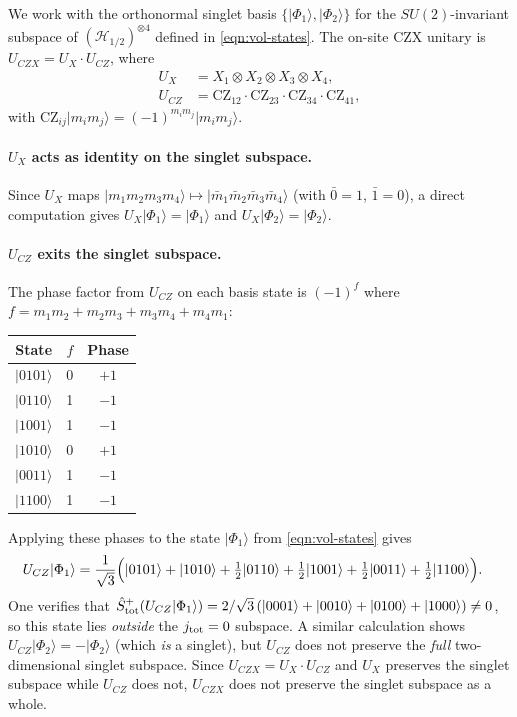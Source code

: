 \documentclass[preprint]{SciPost}
\newcommand{\mc}[1]{\mathcal{#1}}
\newcommand{\ket}[1]{\vert #1 \rangle}
\theoremstyle{plain} %
\begin{document}
We work with the orthonormal singlet basis $\{\ket{\Phi_1},\ket{\Phi_2}\}$ for the $SU(2)$-invariant subspace of $(\mc{H}_{1/2})^{\otimes 4}$ defined in \eqref{eqn:vol-states}. The on-site CZX unitary is $U_{CZX} = U_X \cdot U_{CZ}$, where
\begin{align}
  U_X &= X_1\otimes X_2\otimes X_3\otimes X_4, \\
  U_{CZ} &= \mathrm{CZ}_{12}\cdot\mathrm{CZ}_{23}\cdot\mathrm{CZ}_{34}\cdot\mathrm{CZ}_{41},
\end{align}
with $\mathrm{CZ}_{ij}\ket{m_i m_j} = (-1)^{m_i m_j}\ket{m_i m_j}$.

\paragraph{$U_X$ acts as identity on the singlet subspace.}
Since $U_X$ maps $\ket{m_1 m_2 m_3 m_4}\mapsto\ket{\bar{m}_1\bar{m}_2\bar{m}_3\bar{m}_4}$ (with $\bar{0}=1$, $\bar{1}=0$), a direct computation gives $U_X\ket{\Phi_1} = \ket{\Phi_1}$ and $U_X\ket{\Phi_2} = \ket{\Phi_2}$.

\paragraph{$U_{CZ}$ exits the singlet subspace.}
The phase factor from $U_{CZ}$ on each basis state is $(-1)^f$ where $f = m_1m_2+m_2m_3+m_3m_4+m_4m_1$:

\begin{center}
\begin{tabular}{c|c|c}
  State & $f$ & Phase \\ \hline
  $\ket{0101}$ & 0 & $+1$ \\
  $\ket{0110}$ & 1 & $-1$ \\
  $\ket{1001}$ & 1 & $-1$ \\
  $\ket{1010}$ & 0 & $+1$ \\
  $\ket{0011}$ & 1 & $-1$ \\
  $\ket{1100}$ & 1 & $-1$ \\
\end{tabular}
\end{center}

Applying these phases to the state $\ket{\Phi_1}$ from \eqref{eqn:vol-states} gives
\begin{align}
  U_{CZ}\ket{\Phi_1} &= \frac{1}{\sqrt{3}}\Bigl(\ket{0101}+\ket{1010}+\tfrac12\ket{0110}+\tfrac12\ket{1001}+\tfrac12\ket{0011}+\tfrac12\ket{1100}\Bigr).
\end{align}
One verifies that $\hat{S}^+_{\rm tot}(U_{CZ}\ket{\Phi_1}) = 2/\sqrt{3}\,(\ket{0001}+\ket{0010}+\ket{0100}+\ket{1000}) \neq 0$, so this state lies \emph{outside} the $j_{\rm tot}=0$ subspace. A similar calculation shows $U_{CZ}\ket{\Phi_2} = -\ket{\Phi_2}$ (which \emph{is} a singlet), but $U_{CZ}$ does not preserve the \emph{full} two-dimensional singlet subspace. Since $U_{CZX} = U_X\cdot U_{CZ}$ and $U_X$ preserves the singlet subspace while $U_{CZ}$ does not, $U_{CZX}$ does not preserve the singlet subspace as a whole.
\end{document}
